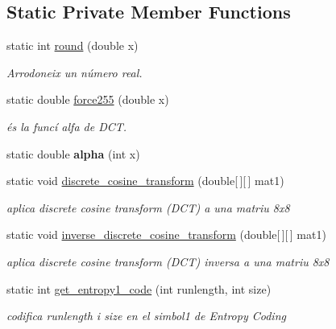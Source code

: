 \subsection*{Static Private Member Functions}
\begin{DoxyCompactItemize}
\item 
static int \hyperlink{classdomini_1_1algorithm_1_1JPEG_aa9c52789d61d5eebdeb13ee39f8e817d}{round} (double x)
\begin{DoxyCompactList}\small\item\em Arrodoneix un número real. \end{DoxyCompactList}\item 
static double \hyperlink{classdomini_1_1algorithm_1_1JPEG_af86bdbb6b6f5671abff6bc6bd5f6349d}{force255} (double x)
\begin{DoxyCompactList}\small\item\em és la funcí alfa de D\+CT. \end{DoxyCompactList}\item 
\mbox{\label{classdomini_1_1algorithm_1_1JPEG_a058b0ee7eb44bbaec4078b5fc32c5107}} 
static double {\bfseries alpha} (int x)
\item 
static void \hyperlink{classdomini_1_1algorithm_1_1JPEG_a367e6d1e6543bf3d8c847aae36f4b6bf}{discrete\+\_\+cosine\+\_\+transform} (double\mbox{[}$\,$\mbox{]}\mbox{[}$\,$\mbox{]} mat1)
\begin{DoxyCompactList}\small\item\em aplica discrete cosine transform (D\+CT) a una matriu 8x8 \end{DoxyCompactList}\item 
static void \hyperlink{classdomini_1_1algorithm_1_1JPEG_a3a6e16b0ee34746e4b0118ed9107bd75}{inverse\+\_\+discrete\+\_\+cosine\+\_\+transform} (double\mbox{[}$\,$\mbox{]}\mbox{[}$\,$\mbox{]} mat1)
\begin{DoxyCompactList}\small\item\em aplica discrete cosine transform (D\+CT) inversa a una matriu 8x8 \end{DoxyCompactList}\item 
\mbox{\label{classdomini_1_1algorithm_1_1JPEG_a0f897c6c525d81551539df1eb8db7e12}} 
static int \hyperlink{classdomini_1_1algorithm_1_1JPEG_a0f897c6c525d81551539df1eb8db7e12}{get\+\_\+entropy1\+\_\+code} (int runlength, int size)
\begin{DoxyCompactList}\small\item\em codifica runlength i size en el simbol1 de Entropy Coding \end{DoxyCompactList}\item 

\end{DoxyCompactItemize}
